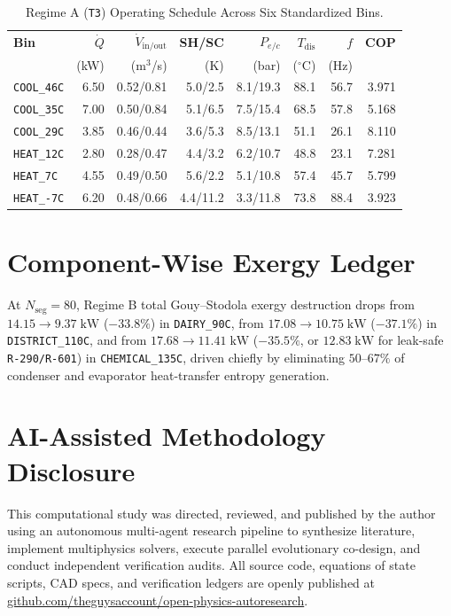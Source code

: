 \documentclass[twocolumn,10pt]{article}
\begin{document}
\begin{table}[h]
\centering
\caption{Regime A (\texttt{T3}) Operating Schedule Across Six Standardized Bins.}
\label{tab:binsA}
\scriptsize
\begin{tabular}{@{}lrrrrrrr@{}}
\toprule
\textbf{Bin} & \textbf{$\dot{Q}$} & \textbf{$\dot{V}_{\text{in/out}}$} & \textbf{SH/SC} & \textbf{$P_{e/c}$} & \textbf{$T_{\text{dis}}$} & \textbf{$f$} & \textbf{COP} \\
 & (kW) & (m$^3$/s) & (K) & (bar) & ($^\circ$C) & (Hz) & \\
\midrule
\texttt{COOL\_46C} & 6.50 & 0.52/0.81 & 5.0/2.5 & 8.1/19.3 & 88.1 & 56.7 & 3.971 \\
\texttt{COOL\_35C} & 7.00 & 0.50/0.84 & 5.1/6.5 & 7.5/15.4 & 68.5 & 57.8 & 5.168 \\
\texttt{COOL\_29C} & 3.85 & 0.46/0.44 & 3.6/5.3 & 8.5/13.1 & 51.1 & 26.1 & 8.110 \\
\texttt{HEAT\_12C} & 2.80 & 0.28/0.47 & 4.4/3.2 & 6.2/10.7 & 48.8 & 23.1 & 7.281 \\
\texttt{HEAT\_7C}  & 4.55 & 0.49/0.50 & 5.6/2.2 & 5.1/10.8 & 57.4 & 45.7 & 5.799 \\
\texttt{HEAT\_-7C} & 6.20 & 0.48/0.66 & 4.4/11.2 & 3.3/11.8 & 73.8 & 88.4 & 3.923 \\
\bottomrule
\end{tabular}
\end{table}

\section{Component-Wise Exergy Ledger}
At $N_{\text{seg}}=80$, Regime B total Gouy--Stodola exergy destruction drops from $14.15\to 9.37\;\text{kW}$ ($-33.8\%$) in \texttt{DAIRY\_90C}, from $17.08\to 10.75\;\text{kW}$ ($-37.1\%$) in \texttt{DISTRICT\_110C}, and from $17.68\to 11.41\;\text{kW}$ ($-35.5\%$, or $12.83\;\text{kW}$ for leak-safe \texttt{R-290/R-601}) in \texttt{CHEMICAL\_135C}, driven chiefly by eliminating $50\text{--}67\%$ of condenser and evaporator heat-transfer entropy generation.

\section*{AI-Assisted Methodology Disclosure}
This computational study was directed, reviewed, and published by the author using an autonomous multi-agent research pipeline to synthesize literature, implement multiphysics solvers, execute parallel evolutionary co-design, and conduct independent verification audits. All source code, equations of state scripts, CAD specs, and verification ledgers are openly published at \href{https://github.com/theguysaccount/open-physics-autoresearch}{github.com/theguysaccount/open-physics-autoresearch}.



\end{document}
